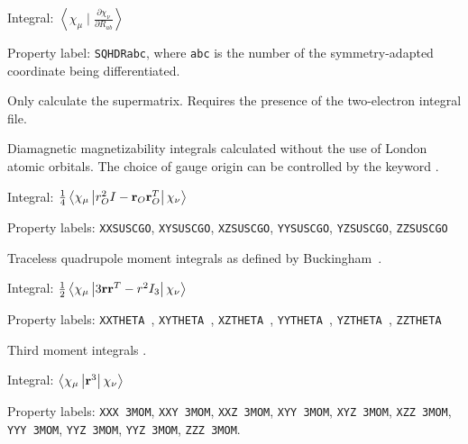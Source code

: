\begin{description}
\begin{list}{}{}
\item Integral: $\left<\chi_{\mu}\mid\frac{\partial\chi_{\nu}}{\partial
R_{ab}}\right>$
\item Property label: \verb|SQHDRabc|, where \verb|abc| is the number
of the symmetry-adapted coordinate being differentiated.
\end{list}

\item[\Key{SUPONL}] Only calculate the supermatrix. Requires the
presence of the two-electron integral file.

\item[\Key{SUSCGO}] Diamagnetic magnetizability integrals calculated
without the use of London atomic orbitals. The choice of gauge
origin
can be controlled by the keyword .

\begin{list}{}{}
\item Integral: $\frac{1}{4}\left<\chi_{\mu}\left|r^{2}_{O}I - {\bf r}_{O}
{\bf r}_{O}^{T}\right|\chi_{\nu}\right>$
\item Property labels: \verb|XXSUSCGO|, \verb|XYSUSCGO|,
\verb|XZSUSCGO|, \verb|YYSUSCGO|, \verb|YZSUSCGO|, \verb|ZZSUSCGO|
\end{list}

\item[\Key{THETA}] Traceless quadrupole moment integrals as defined by Buckingham~\cite{adbacp12}.

\begin{list}{}{}
\item Integral: $\frac{1}{2}\left<\chi_{\mu}\left|
3{\bf r} {\bf r}^{T} - r^{2}I_3
\right|\chi_{\nu}\right>$
\item Property labels: \verb|XXTHETA |, \verb|XYTHETA |,
\verb|XZTHETA |, \verb|YYTHETA |, \verb|YZTHETA |, \verb|ZZTHETA |
\end{list}

\item[\Key{THIRDM}] Third moment integrals
.

\begin{list}{}{}
\item Integral: $\left<\chi_{\mu}\left|{\bf r}^3\right|\chi_{\nu}\right>$
\item Property labels: \verb|XXX 3MOM|, \verb|XXY 3MOM|, \verb|XXZ 3MOM|, 
\verb|XYY 3MOM|, \verb|XYZ 3MOM|, \verb|XZZ 3MOM|, \verb|YYY 3MOM|, 
\verb|YYZ 3MOM|, \verb|YYZ 3MOM|, \verb|ZZZ 3MOM|. 
\end{list}


\end{description}
